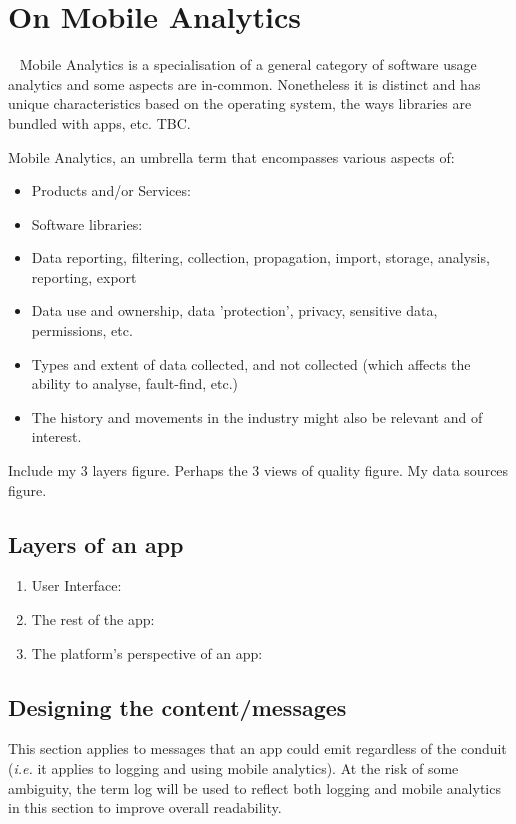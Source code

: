 \chapter{On Mobile Analytics}~\label{chapter-on-mobile-analytics}
Mobile Analytics is a specialisation of a general category of software usage analytics and some aspects are in-common. Nonetheless it is distinct and has unique characteristics based on the operating system, the ways libraries are bundled with apps, etc. TBC.

Mobile Analytics, an umbrella term that encompasses various aspects of:
\begin{itemize}
    \item Products and/or Services:
    \item Software libraries:
    \item Data reporting, filtering, collection, propagation, import, storage, analysis, reporting, export
    \item Data use and ownership, data 'protection', privacy, sensitive data, permissions, etc.
    \item Types and extent of data collected, and not collected (which affects the ability to analyse, fault-find, etc.)
    \item The history and movements in the industry might also be relevant and of interest.
\end{itemize}

Include my 3 layers figure. Perhaps the 3 views of quality figure. My data sources figure. 

\section{Layers of an app}
\begin{enumerate}
    \item User Interface:
    \item The rest of the app:
    \item The platform's perspective of an app:
\end{enumerate}


\section{Designing the content/messages} 
This section applies to messages that an app could emit regardless of the conduit (\emph{i.e.} it applies to logging and using mobile analytics). At the risk of some ambiguity, the term log will be used to reflect both logging and mobile analytics in this section to improve overall readability.

